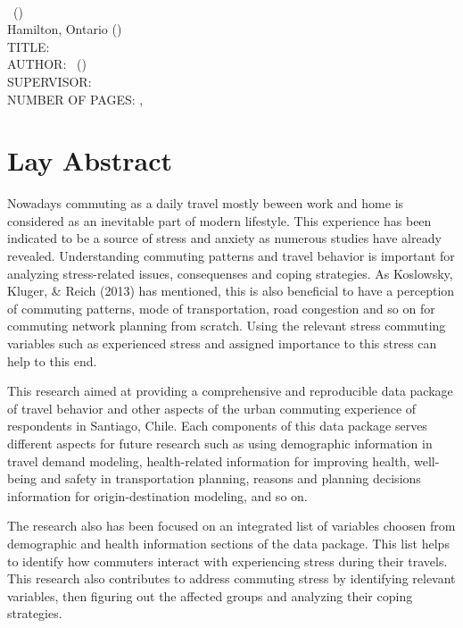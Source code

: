 \documentclass[
11pt, %
oneside, %
english, %
singlespacing, %
]{macthesis} %
\begin{document}
\noindent %
\univname \\
\degreename\, (\the\year) \\
Hamilton, Ontario (\deptname) \\[1.5cm]
TITLE: \ttitle \\
AUTHOR: \authorname\,  %
(\univname)  \\
SUPERVISOR: \supname\, \\
NUMBER OF PAGES: \pageref{lastoffront}, \pageref{LastPage}  %

\clearpage

\section*{Lay Abstract}
  Nowadays commuting as a daily travel mostly beween work and home is considered as an inevitable part of modern lifestyle. This experience has been indicated to be a source of stress and anxiety as numerous studies have already revealed. Understanding commuting patterns and travel behavior is important for analyzing stress-related issues, consequenses and coping strategies. As Koslowsky, Kluger, \& Reich (2013) has mentioned, this is also beneficial to have a perception of commuting patterns, mode of transportation, road congestion and so on for commuting network planning from scratch. Using the relevant stress commuting variables such as experienced stress and assigned importance to this stress can help to this end.

  This research aimed at providing a comprehensive and reproducible data package of travel behavior and other aspects of the urban commuting experience of respondents in Santiago, Chile. Each components of this data package serves different aspects for future research such as using demographic information in travel demand modeling, health-related information for improving health, well-being and safety in transportation planning, reasons and planning decisions information for origin-destination modeling, and so on.

  The research also has been focused on an integrated list of variables choosen from demographic and health information sections of the data package. This list helps to identify how commuters interact with experiencing stress during their travels. This research also contributes to address commuting stress by identifying relevant variables, then figuring out the affected groups and analyzing their coping strategies.
\clearpage
\end{document}
